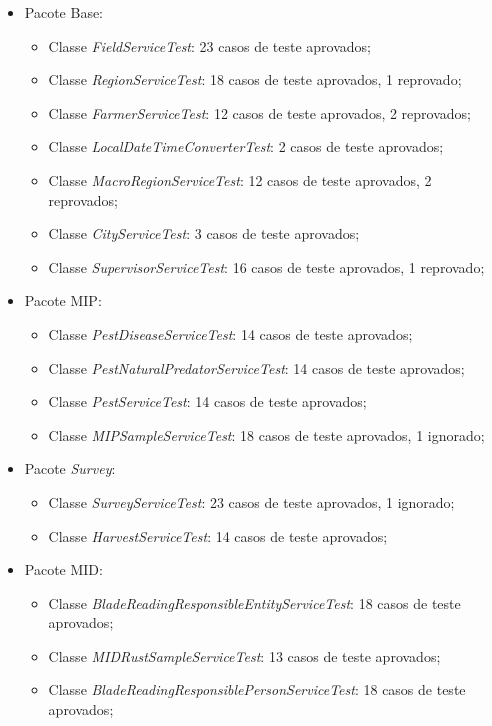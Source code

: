 \begin{itemize}
        \item Pacote Base:
\begin{itemize}
    \item Classe \textit{FieldServiceTest}: 23 casos de teste aprovados;
    \item Classe \textit{RegionServiceTest}: 18 casos de teste aprovados, 1 reprovado;
    \item Classe \textit{FarmerServiceTest}: 12 casos de teste aprovados, 2 reprovados;
    \item Classe \textit{LocalDateTimeConverterTest}: 2 casos de teste aprovados;
    \item Classe \textit{MacroRegionServiceTest}: 12 casos de teste aprovados, 2 reprovados;
    \item Classe \textit{CityServiceTest}: 3 casos de teste aprovados;
    \item Classe \textit{SupervisorServiceTest}: 16 casos de teste aprovados, 1 reprovado;
\end{itemize}
  \item Pacote MIP:
  \begin{itemize} 
    \item Classe \textit{PestDiseaseServiceTest}: 14 casos de teste aprovados;
    \item Classe \textit{PestNaturalPredatorServiceTest}: 14 casos de teste aprovados; 
    \item Classe \textit{PestServiceTest}: 14 casos de teste aprovados;
    \item Classe \textit{MIPSampleServiceTest}: 18 casos de teste aprovados, 1 ignorado;
\end{itemize}
  \item Pacote \textit{Survey}:
  \begin{itemize}   
    \item Classe \textit{SurveyServiceTest}: 23 casos de teste aprovados, 1 ignorado;
    \item Classe \textit{HarvestServiceTest}: 14 casos de teste aprovados;
\end{itemize}
  \item Pacote MID:
  \begin{itemize}
    \item Classe \textit{BladeReadingResponsibleEntityServiceTest}: 18 casos de teste aprovados;
    \item Classe \textit{MIDRustSampleServiceTest}: 13 casos de teste aprovados;
    \item Classe \textit{BladeReadingResponsiblePersonServiceTest}: 18 casos de teste aprovados;

\end{itemize}
\end{itemize}
